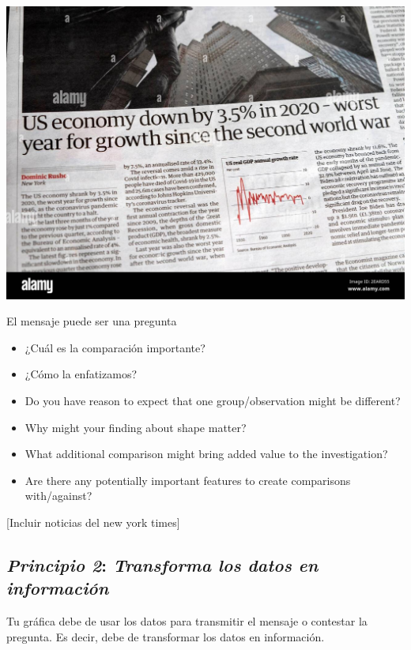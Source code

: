 \documentclass[
  letterpaper,
  DIV=11,
  numbers=noendperiod]{scrartcl}
\begin{document}
\includegraphics{images/clipboard-1023529598.png}

El mensaje puede ser una pregunta

\begin{itemize}
\item
  ¿Cuál es la comparación importante?
\item
  ¿Cómo la enfatizamos?
\item
  Do you have reason to expect that one group/observation might be
  different?
\item
  Why might your finding about shape matter?
\item
  What additional comparison might bring added value to the
  investigation?
\item
  Are there any potentially important features to create comparisons
  with/against?
\end{itemize}

{[}Incluir noticias del new york times{]}

\hypertarget{principio-2-transforma-los-datos-en-informaciuxf3n}{%
\subsection{\texorpdfstring{\textbf{\emph{Principio 2}: \emph{Transforma
los datos en
información}}}{Principio 2: Transforma los datos en información}}\label{principio-2-transforma-los-datos-en-informaciuxf3n}}

Tu gráfica debe de usar los datos para transmitir el mensaje o contestar
la pregunta. Es decir, debe de transformar los datos en información.
\end{document}
